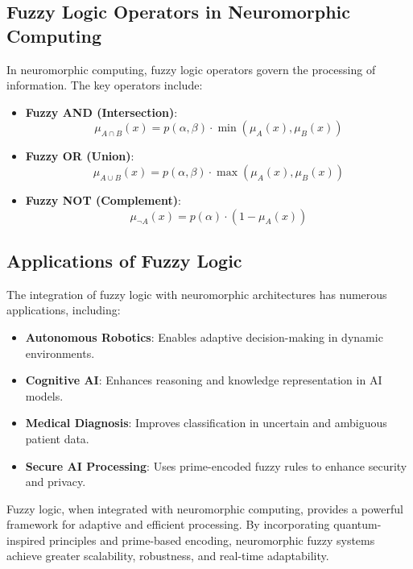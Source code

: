 \documentclass{article}
\theoremstyle{plain}
\begin{document}
\begin{itemize}
\begin{itemize}
\subsection{Fuzzy Logic Operators in Neuromorphic Computing}
In neuromorphic computing, fuzzy logic operators govern the processing of information. The key operators include:
\begin{itemize}
    \item \textbf{Fuzzy AND (Intersection)}:
    \begin{equation}
        \mu_{A \cap B}(x) = p(\alpha, \beta) \cdot \min(\mu_A(x), \mu_B(x))
    \end{equation}
    \item \textbf{Fuzzy OR (Union)}:
    \begin{equation}
        \mu_{A \cup B}(x) = p(\alpha, \beta) \cdot \max(\mu_A(x), \mu_B(x))
    \end{equation}
    \item \textbf{Fuzzy NOT (Complement)}:
    \begin{equation}
        \mu_{\neg A}(x) = p(\alpha) \cdot (1 - \mu_A(x))
    \end{equation}
\end{itemize}

\subsection{Applications of Fuzzy Logic}
The integration of fuzzy logic with neuromorphic architectures has numerous applications, including:
\begin{itemize}
    \item \textbf{Autonomous Robotics}: Enables adaptive decision-making in dynamic environments.
    \item \textbf{Cognitive AI}: Enhances reasoning and knowledge representation in AI models.
    \item \textbf{Medical Diagnosis}: Improves classification in uncertain and ambiguous patient data.
    \item \textbf{Secure AI Processing}: Uses prime-encoded fuzzy rules to enhance security and privacy.
\end{itemize}

Fuzzy logic, when integrated with neuromorphic computing, provides a powerful framework for adaptive and efficient processing. By incorporating quantum-inspired principles and prime-based encoding, neuromorphic fuzzy systems achieve greater scalability, robustness, and real-time adaptability.


\end{itemize}
\end{itemize}
\end{document}
